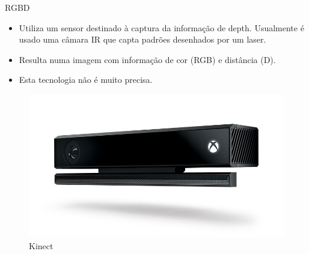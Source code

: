 \begin{frame}{RGBD}
			
	\begin{minipage}{0.5\textwidth}
		\begin{itemize}
			\item Utiliza um sensor destinado à captura da informação de depth. Usualmente é usado uma câmara IR que capta padrões desenhados por um laser.
			\item Resulta numa imagem com informação de cor (RGB) e distância (D).
			\item Esta tecnologia não é muito precisa.
		\end{itemize}
	\end{minipage}%
	\begin{minipage}{0.5\textwidth}
		\begin{figure}
			\includegraphics[width=.9\textwidth]{img/kinect.jpg}
			\caption{Kinect}
		\end{figure}
	\end{minipage}
						
\end{frame}

